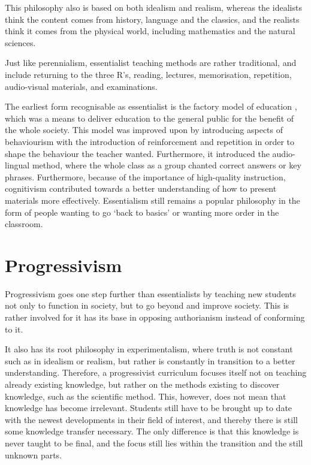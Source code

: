 This philosophy also is based on both idealism and realism, whereas the idealists think the content comes from history, language and the classics, and the realists think it comes from the physical world, including mathematics and the natural sciences.

Just like perennialism, essentialist teaching methods are rather traditional, and include returning to the three R's, reading, lectures, memorisation, repetition, audio-visual materials, and examinations.

The earliest form recognisable as essentialist is the factory model of education \cite{honours}, which was a means to deliver education to the general public for the benefit of the whole society. This model was improved upon by introducing aspects of behaviourism with the introduction of reinforcement and repetition in order to shape the behaviour the teacher wanted. Furthermore, it introduced the audio-lingual method, where the whole class as a group chanted correct answers or key phrases. Furthermore, because of the importance of high-quality instruction, cognitivism contributed towards a better understanding of how to present materials more effectively. Essentialism still remains a popular philosophy in the form of people wanting to go `back to basics' or wanting more order in the classroom.

\section{Progressivism}

Progressivism goes one step further than essentialists by teaching new students not only to function in society, but to go beyond and improve society. This is rather involved for it has its base in opposing authorianism instead of conforming to it.

It also has its root philosophy in experimentalism, where truth is not constant such as in idealism or realism, but rather is constantly in transition to a better understanding. Therefore, a progressivist curriculum focuses itself not on teaching already existing knowledge, but rather on the methods existing to discover knowledge, such as the scientific method. This, however, does not mean that knowledge has become irrelevant. Students still have to be brought up to date with the newest developments in their field of interest, and thereby there is still some knowledge transfer necessary. The only difference is that this knowledge is never taught to be final, and the focus still lies within the transition and the still unknown parts.

